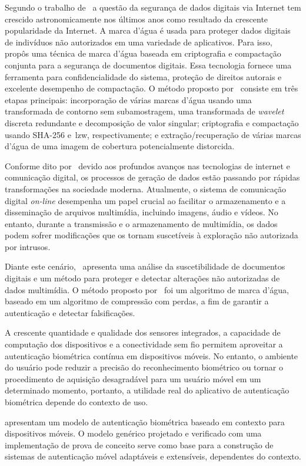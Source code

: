 Segundo o trabalho de~\textcite{singh2021} a questão da segurança de dados
digitais via Internet tem crescido astronomicamente nos últimos anos como
resultado da crescente popularidade da Internet.
A marca d'água é usada para proteger dados digitais de indivíduos não
autorizados em uma variedade de aplicativos.
Para isso,~\textcite{singh2021} propôs uma técnica de marca d'água baseada em
criptografia e compactação conjunta para a segurança de documentos digitais.
Essa tecnologia fornece uma ferramenta para confidencialidade do sistema,
proteção de direitos autorais e excelente desempenho de compactação.
O método proposto por~\textcite{singh2021} consiste em três etapas principais:
incorporação de várias marcas d'água usando uma transformada de contorno sem
subamostragem, uma transformada de \textit{wavelet} discreta redundante e decomposição
de valor singular; criptografia e compactação usando SHA-256 e~\acrfull{lzw},
respectivamente; e extração/recuperação de várias marcas d'água de uma imagem
de cobertura potencialmente distorcida.

Conforme dito por~\textcite{kabir2021} devido aos profundos avanços nas
tecnologias de internet e comunicação digital,
os processos de geração de dados estão passando por rápidas transformações na
sociedade moderna.
Atualmente, o sistema de comunicação digital \textit{on-line} desempenha um
papel
crucial ao facilitar o armazenamento e a disseminação de arquivos multimídia,
incluindo imagens, áudio e vídeos.
No entanto, durante a transmissão e o armazenamento de multimídia,
os dados podem sofrer modificações que os tornam suscetíveis à exploração
não autorizada por intrusos\cite{kabir2021}.

Diante este cenário,~\textcite{kabir2021} apresenta uma análise da
suscetibilidade de documentos digitais e um método para proteger e detectar
alterações não autorizadas de dados multimídia.
O método proposto por~\textcite{kabir2021} foi um algoritmo de marca d'água,
baseado em um algoritmo de compressão com perdas, a fim de garantir a
autenticação e detectar falsificações.

A crescente quantidade e qualidade dos sensores integrados, a capacidade de
computação
dos dispositivos e a conectividade sem fio permitem aproveitar a autenticação
biométrica contínua em dispositivos móveis.
No entanto, o ambiente do usuário pode reduzir a precisão do reconhecimento
biométrico ou tornar o procedimento de aquisição desagradável para um usuário
móvel em um determinado momento, portanto, a utilidade real do aplicativo de
autenticação biométrica depende do contexto de uso\cite{wojtowicz2016}.

\textcite{wojtowicz2016} apresentam um modelo de autenticação biométrica baseado
em contexto para dispositivos móveis.
O modelo genérico projetado e verificado com uma implementação de prova de
conceito
serve como base para a construção de sistemas de autenticação móvel adaptáveis e
extensíveis, dependentes do contexto.
